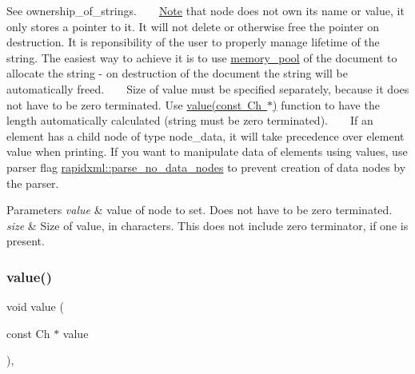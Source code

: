 See ownership\+\_\+of\+\_\+strings. ~\newline
~\newline
 \mbox{\hyperlink{classNote}{Note}} that node does not own its name or value, it only stores a pointer to it. It will not delete or otherwise free the pointer on destruction. It is reponsibility of the user to properly manage lifetime of the string. The easiest way to achieve it is to use \mbox{\hyperlink{classrapidxml_1_1memory__pool}{memory\+\_\+pool}} of the document to allocate the string -\/ on destruction of the document the string will be automatically freed. ~\newline
~\newline
 Size of value must be specified separately, because it does not have to be zero terminated. Use \mbox{\hyperlink{classrapidxml_1_1xml__base_a18c7469acdca771de9b4f3054053029c}{value(const Ch $\ast$)}} function to have the length automatically calculated (string must be zero terminated). ~\newline
~\newline
 If an element has a child node of type node\+\_\+data, it will take precedence over element value when printing. If you want to manipulate data of elements using values, use parser flag \mbox{\hyperlink{namespacerapidxml_a87e8bbab53702cf3b438bd553c10b6b9}{rapidxml\+::parse\+\_\+no\+\_\+data\+\_\+nodes}} to prevent creation of data nodes by the parser. 
\begin{DoxyParams}{Parameters}
{\em value} & value of node to set. Does not have to be zero terminated. \\
\hline
{\em size} & Size of value, in characters. This does not include zero terminator, if one is present. \\
\hline
\end{DoxyParams}
\mbox{\label{classrapidxml_1_1xml__base_a18c7469acdca771de9b4f3054053029c}} 
\subsubsection{\texorpdfstring{value()}{value()}\hspace{0.1cm}{\footnotesize\ttfamily [3/3]}}
{\footnotesize\ttfamily void value (\begin{DoxyParamCaption}\item[{const Ch $\ast$}]{value }\end{DoxyParamCaption})\hspace{0.3cm}{\ttfamily [inline]}, {\ttfamily [inherited]}}



